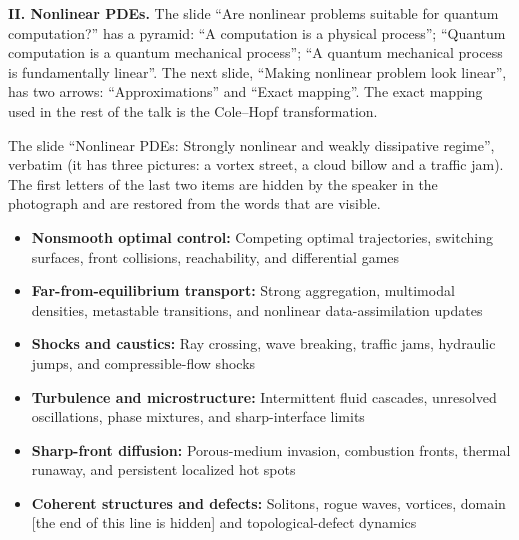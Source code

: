 \medskip\noindent
{\bf II. Nonlinear PDEs.}
The slide ``Are nonlinear problems suitable for
quantum computation?'' has a pyramid: ``A
computation is a physical process'';
``Quantum computation is a quantum mechanical
process''; ``A quantum mechanical process is
fundamentally linear''. The next slide,
``Making nonlinear problem look linear'',
has two arrows: ``Approximations'' and
``Exact mapping''. The exact mapping used in
the rest of the talk is the Cole--Hopf
transformation.

\begin{remark}
\label{remark-liu-nonlinear-pdes}
The slide ``Nonlinear PDEs: Strongly nonlinear
and weakly dissipative regime'', verbatim
(it has three pictures: a vortex street, a
cloud billow and a traffic jam). The first
letters of the last two items are hidden by the
speaker in the photograph and are restored
from the words that are visible.
\begin{itemize}
\item {\bf Nonsmooth optimal control:}
Competing optimal trajectories, switching
surfaces, front collisions, reachability, and
differential games

\item {\bf Far-from-equilibrium transport:}
Strong aggregation, multimodal densities,
metastable transitions, and nonlinear
data-assimilation updates

\item {\bf Shocks and caustics:}
Ray crossing, wave breaking, traffic jams,
hydraulic jumps, and compressible-flow shocks

\item {\bf Turbulence and microstructure:}
Intermittent fluid cascades, unresolved
oscillations, phase mixtures, and
sharp-interface limits

\item {\bf Sharp-front diffusion:}
Porous-medium invasion, combustion fronts,
thermal runaway, and persistent localized hot
spots

\item {\bf Coherent structures and defects:}
Solitons, rogue waves, vortices, domain
[the end of this line is hidden] and
topological-defect dynamics
\end{itemize}
\end{remark}

